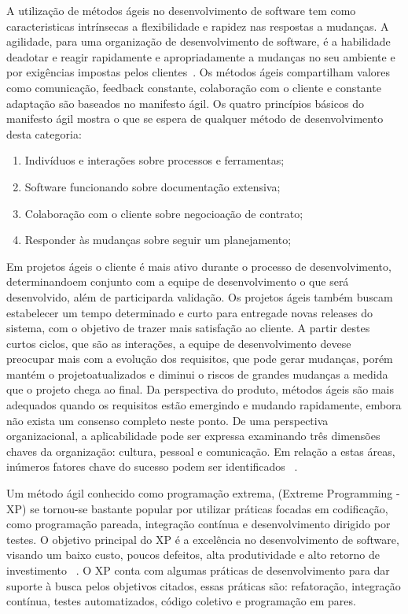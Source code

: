A utilização de métodos ágeis no desenvolvimento de software tem como caracteristicas 
intrínsecas a flexibilidade e rapidez nas respostas a mudanças. 
%
A agilidade, para uma organização de desenvolvimento de software, é a habilidade 
deadotar e reagir rapidamente e apropriadamente a mudanças no seu ambiente e por 
exigências impostas pelos clientes~\cite{nerur2005}.
%
Os métodos ágeis compartilham valores como comunicação, feedback constante, colaboração 
com o cliente e constante adaptação são baseados no manifesto ágil. Os quatro princípios 
básicos do manifesto ágil mostra o que se espera de qualquer método de desenvolvimento 
desta categoria:
%
\begin{enumerate}
\item Indivíduos  e interações sobre processos e ferramentas;
\item Software funcionando sobre documentação extensiva;
\item Colaboração com o cliente sobre negocioação de contrato;
\item Responder às  mudanças sobre seguir um planejamento;
\end{enumerate}
%
Em projetos ágeis o cliente é mais ativo durante o processo de desenvolvimento, 
determinandoem conjunto com a equipe de desenvolvimento o que será desenvolvido, 
além de participarda validação. Os projetos ágeis também buscam estabelecer um 
tempo determinado e curto para entregade novas releases do sistema, com o objetivo 
de trazer mais satisfação ao cliente.
%
A partir destes curtos ciclos, que são as interações, a equipe de desenvolvimento 
devese preocupar mais com a evolução dos requisitos, que pode gerar mudanças, porém 
mantém o projetoatualizados e diminui o riscos de grandes mudanças a medida que o 
projeto chega ao final.
%
Da perspectiva do produto, métodos ágeis são mais adequados quando os requisitos 
estão emergindo e mudando rapidamente, embora não exista um consenso completo 
neste ponto. De uma perspectiva organizacional, a aplicabilidade pode ser expressa 
examinando três dimensões chaves da organização: cultura, pessoal e comunicação. 
Em relação a estas áreas, inúmeros fatores chave do sucesso podem ser identificados 
~\cite{cohen2004}.

Um método ágil conhecido como programação extrema, (Extreme Programming - XP) se 
tornou-se bastante popular por utilizar práticas focadas em codificação, como 
programação pareada, integração contínua e desenvolvimento dirigido por testes.
%
O objetivo principal do XP é a excelência no desenvolvimento de software, visando 
um baixo custo, poucos defeitos, alta produtividade e alto retorno de investimento
~\cite{sato2007}.
O XP conta com algumas práticas de desenvolvimento para dar suporte à busca pelos 
objetivos citados, essas práticas são: refatoração, integração contínua, testes 
automatizados, código coletivo e programação em pares.

